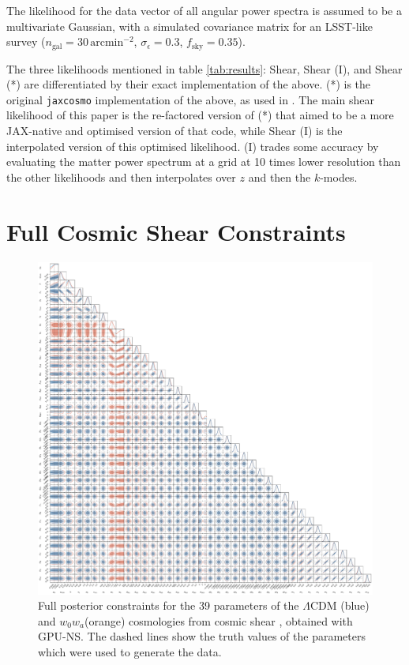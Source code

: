 \documentclass[twocolumn]{openjournal}
\begin{document}
The likelihood for the data vector of all angular power spectra is assumed to be a multivariate Gaussian, with a simulated covariance matrix for an LSST-like survey ($n_{\text{gal}} = 30\,\text{arcmin}^{-2}$, $\sigma_{\epsilon} = 0.3$, $f_\text{sky} = 0.35$).

The three likelihoods mentioned in table \ref{tab:results}: Shear, Shear (I), and Shear (*) are differentiated by their exact implementation of the above. (*) is the original \texttt{jax\textunderscore cosmo} implementation of the above, as used in \citep{Piras_2024}. The main shear likelihood of this paper is the re-factored version of (*) that aimed to be a more JAX-native and optimised version of that code, while Shear (I) is the interpolated version of this optimised likelihood. (I) trades some accuracy by evaluating the matter power spectrum at a grid at 10 times lower resolution than the other likelihoods and then interpolates over $z$ and then the $k$-modes.

\section{Full Cosmic Shear Constraints}\label{fullshearconstraints}

\begin{figure}[H]
    \centering
    \includegraphics[width=\textwidth]{fullposterior.pdf}
    \caption{Full posterior constraints for the 39 parameters of the $\Lambda$CDM (blue) and $w_0w_a$(orange) cosmologies from cosmic shear , obtained with GPU-NS. The dashed lines show the truth values of the parameters which were used to generate the data.}
    \label{shearfull}
\end{figure}
\end{document}
